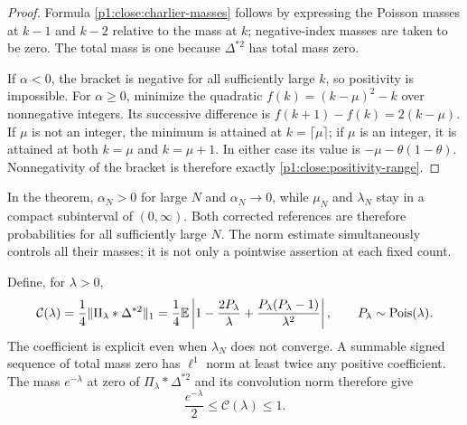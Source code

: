 \begin{proof}
Formula \eqref{p1:close:charlier-masses} follows by expressing
the Poisson masses at $k-1$ and $k-2$ relative to the mass
at $k$; negative-index masses are taken to be zero.
The total mass is one because $\Delta^{*2}$ has total mass
zero.

If $\alpha<0$, the bracket is negative for all sufficiently
large $k$, so positivity is impossible.
For $\alpha\ge0$, minimize the quadratic
$f(k)=(k-\mu)^2-k$ over nonnegative integers.
Its successive difference is $f(k+1)-f(k)=2(k-\mu)$.
If $\mu$ is not an integer, the minimum is attained at
$k=\lceil\mu\rceil$; if $\mu$ is an integer, it is attained
at both $k=\mu$ and $k=\mu+1$.  In either case its value is
$-\mu-\theta(1-\theta)$.  Nonnegativity of the bracket
is therefore exactly \eqref{p1:close:positivity-range}.
\end{proof}

In the theorem, $\alpha_N>0$ for large $N$ and $\alpha_N\to0$,
while $\mu_N$ and $\lambda_N$ stay in a compact subinterval
of $(0,\infty)$.  Both corrected references are therefore
probabilities for all sufficiently large $N$.
The norm estimate simultaneously controls all their masses;
it is not only a pointwise assertion at each fixed count.

Define, for $\lambda>0$,
\begin{equation}
 \mathcal C(\lambda)
   =\frac14\|\Pi_\lambda*\Delta^{*2}\|_1
   =\frac14\mathbb E\left|
       1-\frac{2P_\lambda}{\lambda}
          +\frac{P_\lambda(P_\lambda-1)}{\lambda^2}
                   \right|,
 \qquad P_\lambda\sim\operatorname{Pois}(\lambda).
 \label{p1:close:charlier-constant}
\end{equation}
The coefficient is explicit even when $\lambda_N$ does not
converge. A summable signed sequence of total mass zero has
$\ell^1$ norm at least twice any positive coefficient. The mass
$e^{-\lambda}$ at zero of $\Pi_\lambda*\Delta^{*2}$ and its
convolution norm therefore give
\begin{equation}
 \frac{e^{-\lambda}}2\le\mathcal C(\lambda)\le1.
 \label{p1:close:constant-bounds}
\end{equation}
